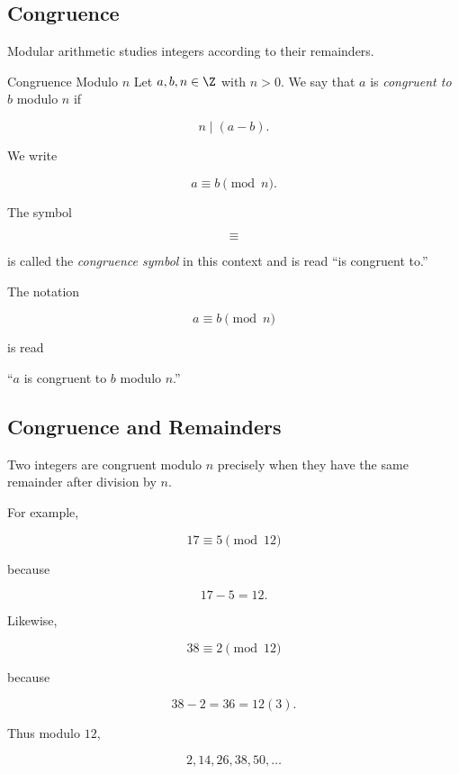 \subsection{Congruence}
\label{subsec:congruence}

Modular arithmetic studies integers according to their remainders.

\begin{definitionbox}{Congruence Modulo \(n\)}
Let \(a,b,n\in\Z\) with \(n>0\). We say that \(a\) is \emph{congruent to}
\(b\) modulo \(n\) if

\[ n\mid(a-b). \]

We write

\[ a\equiv b\pmod n. \]
\end{definitionbox}

The symbol

\[ \equiv \]

is called the \emph{congruence symbol} in this context and is read
``is congruent to.''

The notation

\[ a\equiv b\pmod n \]

is read

\begin{center}
``\(a\) is congruent to \(b\) modulo \(n\).''
\end{center}

\subsection{Congruence and Remainders}
\label{subsec:congruence-remainders}

Two integers are congruent modulo \(n\) precisely when they have the same
remainder after division by \(n\).

For example,

\[ 17\equiv5\pmod{12} \]

because

\[ 17-5=12. \]

Likewise,

\[ 38\equiv2\pmod{12} \]

because

\[ 38-2=36=12(3). \]

Thus modulo \(12\),

\[ 2,14,26,38,50,\ldots \]

